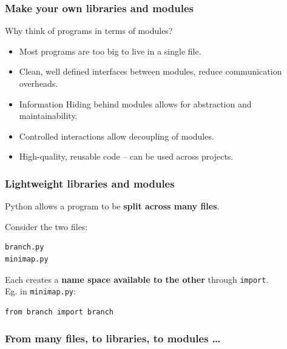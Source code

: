 \documentclass{beamer} %
\newcommand\emc[1]{\textcolor{brightblue}{\textbf{#1}}}
\begin{document}
\begin{frame}

\frametitle{Make your own libraries and modules}

Why think of programs in terms of modules?
\begin{itemize}
  \item Most programs are too big to live in a single file.
  \item Clean, well defined interfaces between modules, reduce communication overheads. 
  \item Information Hiding behind modules allows for abstraction and maintainability.
  \item Controlled interactions allow decoupling of modules.
  \item High-quality, reusable code -- can be used across projects.
\end{itemize}

\end{frame}

\begin{frame}[fragile]

\frametitle{Lightweight libraries and modules}

Python allows a program to be \emc{split across many files}. 

\vspace{3mm}
Consider the two files:
\begin{verbatim}
branch.py
minimap.py
\end{verbatim}

\vspace{3mm}
Each creates a \emc{name space available to the other} through \texttt{import}. \\ Eg. in \texttt{minimap.py}:
\begin{verbatim}
from branch import branch
\end{verbatim}

\end{frame}

\begin{frame}

\frametitle{From many files, to libraries, to modules \ldots}

\end{frame}
\end{document}
